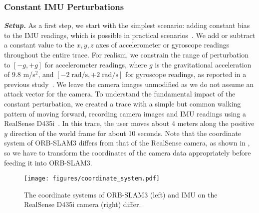 \subsubsection{Constant IMU Perturbations} 
\label{subsubsec:exp-orbslam3-constant}
\textbf{\emph{Setup.}}
As a first step, we start with the simplest scenario: adding constant bias to the IMU readings, which is possible in practical scenarios~\cite{trippel2017walnut}.
We add or subtract a constant value to the $x, y, z$ axes of accelerometer or gyroscope readings throughout the entire trace.
For realism, we constrain the range of perturbation to $[-g,+g]$ for accelerometer readings, where $g$ is the gravitational acceleration of 9.8 m/s$^2$, and $[-2\;\text{rad/s}, +2\;\text{rad/s}]$ for gyroscope readings, as reported in a previous study~\cite{jeong2023rocking}.
We leave the camera images unmodified as we do not assume an attack vector for the camera.
To understand the fundamental impact of the constant perturbation, we created a trace with a simple but common walking pattern of moving forward, recording camera images and IMU readings using a RealSense D435i~\cite{hu2024apple}.
In this trace, the user moves about 4 meters along the positive $y$ direction of the world frame for about 10 seconds. 
Note that the coordinate system of ORB-SLAM3 differs from that of the RealSense camera, as shown in , so we have to transform the coordinates of the camera data appropriately before feeding it into ORB-SLAM3.

\begin{figure}[t]
    \centering
    \texttt{[image: figures/coordinate\_system.pdf]} %
    \caption{The coordinate systems of ORB-SLAM3 (left) and IMU on the RealSense D435i camera (right) differ.}
    \label{fig:coordinate_systems}
\end{figure}

